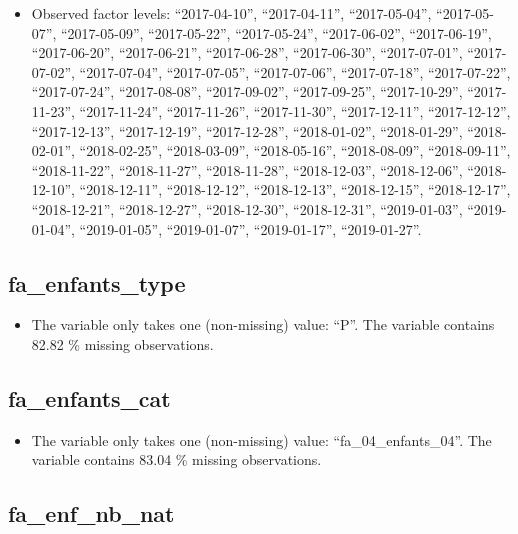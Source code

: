 \documentclass[
  letterpaper,
  DIV=11,
  numbers=noendperiod]{scrartcl}
\providecommand{\tightlist}{%
  \setlength{\itemsep}{0pt}\setlength{\parskip}{0pt}}
\begin{document}
\begin{itemize}
\tightlist
\item
  Observed factor levels: ``2017-04-10'', ``2017-04-11'',
  ``2017-05-04'', ``2017-05-07'', ``2017-05-09'', ``2017-05-22'',
  ``2017-05-24'', ``2017-06-02'', ``2017-06-19'', ``2017-06-20'',
  ``2017-06-21'', ``2017-06-28'', ``2017-06-30'', ``2017-07-01'',
  ``2017-07-02'', ``2017-07-04'', ``2017-07-05'', ``2017-07-06'',
  ``2017-07-18'', ``2017-07-22'', ``2017-07-24'', ``2017-08-08'',
  ``2017-09-02'', ``2017-09-25'', ``2017-10-29'', ``2017-11-23'',
  ``2017-11-24'', ``2017-11-26'', ``2017-11-30'', ``2017-12-11'',
  ``2017-12-12'', ``2017-12-13'', ``2017-12-19'', ``2017-12-28'',
  ``2018-01-02'', ``2018-01-29'', ``2018-02-01'', ``2018-02-25'',
  ``2018-03-09'', ``2018-05-16'', ``2018-08-09'', ``2018-09-11'',
  ``2018-11-22'', ``2018-11-27'', ``2018-11-28'', ``2018-12-03'',
  ``2018-12-06'', ``2018-12-10'', ``2018-12-11'', ``2018-12-12'',
  ``2018-12-13'', ``2018-12-15'', ``2018-12-17'', ``2018-12-21'',
  ``2018-12-27'', ``2018-12-30'', ``2018-12-31'', ``2019-01-03'',
  ``2019-01-04'', ``2019-01-05'', ``2019-01-07'', ``2019-01-17'',
  ``2019-01-27''.
\end{itemize}

\fullline

\subsection{fa\_enfants\_type}\label{fa_enfants_type}

\begin{itemize}
\tightlist
\item
  The variable only takes one (non-missing) value: ``P''. The variable
  contains 82.82 \% missing observations.
\end{itemize}

\fullline

\subsection{fa\_enfants\_cat}\label{fa_enfants_cat}

\begin{itemize}
\tightlist
\item
  The variable only takes one (non-missing) value:
  ``fa\_04\_enfants\_04''. The variable contains 83.04 \% missing
  observations.
\end{itemize}

\fullline

\subsection{fa\_enf\_nb\_nat}\label{fa_enf_nb_nat}
\end{document}
